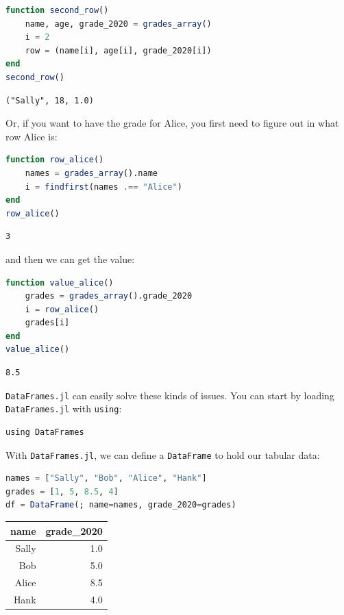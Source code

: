 \documentclass[
  notoc %
]{tufte-book}
\newcommand{\passthrough}[1]{#1}
\begin{document}
\begin{lstlisting}[language=Julia]
function second_row()
    name, age, grade_2020 = grades_array()
    i = 2
    row = (name[i], age[i], grade_2020[i])
end
second_row()
\end{lstlisting}

\begin{lstlisting}[language=Output]
("Sally", 18, 1.0)
\end{lstlisting}

Or, if you want to have the grade for Alice, you first need to figure
out in what row Alice is:

\begin{lstlisting}[language=Julia]
function row_alice()
    names = grades_array().name
    i = findfirst(names .== "Alice")
end
row_alice()
\end{lstlisting}

\begin{lstlisting}[language=Output]
3
\end{lstlisting}

and then we can get the value:

\begin{lstlisting}[language=Julia]
function value_alice()
    grades = grades_array().grade_2020
    i = row_alice()
    grades[i]
end
value_alice()
\end{lstlisting}

\begin{lstlisting}[language=Output]
8.5
\end{lstlisting}

\passthrough{\lstinline!DataFrames.jl!} can easily solve these kinds of
issues. You can start by loading \passthrough{\lstinline!DataFrames.jl!}
with \passthrough{\lstinline!using!}:

\begin{lstlisting}
using DataFrames
\end{lstlisting}

With \passthrough{\lstinline!DataFrames.jl!}, we can define a
\passthrough{\lstinline!DataFrame!} to hold our tabular data:

\begin{lstlisting}[language=Julia]
names = ["Sally", "Bob", "Alice", "Hank"]
grades = [1, 5, 8.5, 4]
df = DataFrame(; name=names, grade_2020=grades)
\end{lstlisting}

\begin{longtable}[]{@{}rr@{}}
\toprule
name & grade\_2020 \\
\midrule
\endhead
Sally & 1.0 \\
Bob & 5.0 \\
Alice & 8.5 \\
Hank & 4.0 \\
\bottomrule
\end{longtable}
\end{document}
